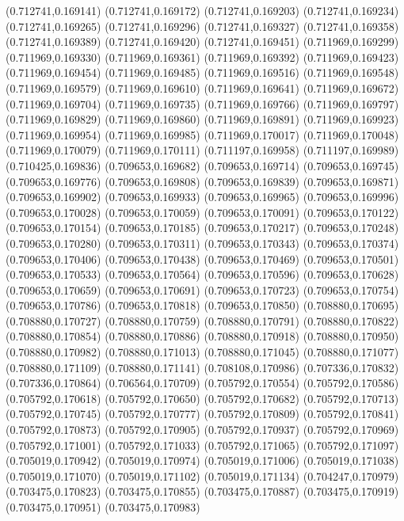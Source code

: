 (0.712741,0.169141)
(0.712741,0.169172)
(0.712741,0.169203)
(0.712741,0.169234)
(0.712741,0.169265)
(0.712741,0.169296)
(0.712741,0.169327)
(0.712741,0.169358)
(0.712741,0.169389)
(0.712741,0.169420)
(0.712741,0.169451)
(0.711969,0.169299)
(0.711969,0.169330)
(0.711969,0.169361)
(0.711969,0.169392)
(0.711969,0.169423)
(0.711969,0.169454)
(0.711969,0.169485)
(0.711969,0.169516)
(0.711969,0.169548)
(0.711969,0.169579)
(0.711969,0.169610)
(0.711969,0.169641)
(0.711969,0.169672)
(0.711969,0.169704)
(0.711969,0.169735)
(0.711969,0.169766)
(0.711969,0.169797)
(0.711969,0.169829)
(0.711969,0.169860)
(0.711969,0.169891)
(0.711969,0.169923)
(0.711969,0.169954)
(0.711969,0.169985)
(0.711969,0.170017)
(0.711969,0.170048)
(0.711969,0.170079)
(0.711969,0.170111)
(0.711197,0.169958)
(0.711197,0.169989)
(0.710425,0.169836)
(0.709653,0.169682)
(0.709653,0.169714)
(0.709653,0.169745)
(0.709653,0.169776)
(0.709653,0.169808)
(0.709653,0.169839)
(0.709653,0.169871)
(0.709653,0.169902)
(0.709653,0.169933)
(0.709653,0.169965)
(0.709653,0.169996)
(0.709653,0.170028)
(0.709653,0.170059)
(0.709653,0.170091)
(0.709653,0.170122)
(0.709653,0.170154)
(0.709653,0.170185)
(0.709653,0.170217)
(0.709653,0.170248)
(0.709653,0.170280)
(0.709653,0.170311)
(0.709653,0.170343)
(0.709653,0.170374)
(0.709653,0.170406)
(0.709653,0.170438)
(0.709653,0.170469)
(0.709653,0.170501)
(0.709653,0.170533)
(0.709653,0.170564)
(0.709653,0.170596)
(0.709653,0.170628)
(0.709653,0.170659)
(0.709653,0.170691)
(0.709653,0.170723)
(0.709653,0.170754)
(0.709653,0.170786)
(0.709653,0.170818)
(0.709653,0.170850)
(0.708880,0.170695)
(0.708880,0.170727)
(0.708880,0.170759)
(0.708880,0.170791)
(0.708880,0.170822)
(0.708880,0.170854)
(0.708880,0.170886)
(0.708880,0.170918)
(0.708880,0.170950)
(0.708880,0.170982)
(0.708880,0.171013)
(0.708880,0.171045)
(0.708880,0.171077)
(0.708880,0.171109)
(0.708880,0.171141)
(0.708108,0.170986)
(0.707336,0.170832)
(0.707336,0.170864)
(0.706564,0.170709)
(0.705792,0.170554)
(0.705792,0.170586)
(0.705792,0.170618)
(0.705792,0.170650)
(0.705792,0.170682)
(0.705792,0.170713)
(0.705792,0.170745)
(0.705792,0.170777)
(0.705792,0.170809)
(0.705792,0.170841)
(0.705792,0.170873)
(0.705792,0.170905)
(0.705792,0.170937)
(0.705792,0.170969)
(0.705792,0.171001)
(0.705792,0.171033)
(0.705792,0.171065)
(0.705792,0.171097)
(0.705019,0.170942)
(0.705019,0.170974)
(0.705019,0.171006)
(0.705019,0.171038)
(0.705019,0.171070)
(0.705019,0.171102)
(0.705019,0.171134)
(0.704247,0.170979)
(0.703475,0.170823)
(0.703475,0.170855)
(0.703475,0.170887)
(0.703475,0.170919)
(0.703475,0.170951)
(0.703475,0.170983)
